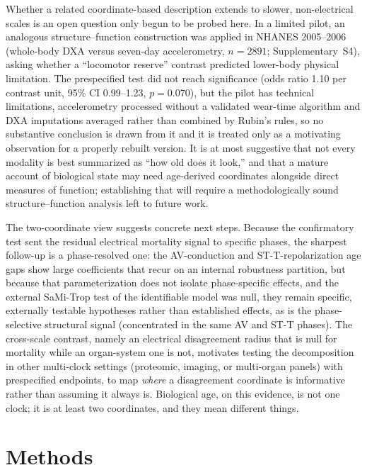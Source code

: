 \documentclass[11pt]{article}
\begin{document}
Whether a related coordinate-based description extends to slower, non-electrical scales is an open
question only begun to be probed here. In a limited pilot, an analogous
structure--function construction was applied in NHANES 2005--2006 (whole-body DXA versus seven-day
accelerometry, $n=\num{2891}$; Supplementary~S4), asking whether a ``locomotor reserve''
contrast predicted lower-body physical limitation. The prespecified test did not reach
significance (odds ratio \num{1.10} per contrast unit, 95\% CI \numrange{0.99}{1.23},
$p=\num{0.070}$), but the pilot has technical limitations, accelerometry processed
without a validated wear-time algorithm and DXA imputations averaged rather than combined
by Rubin's rules, so no substantive conclusion is drawn from it and it is treated only as
a motivating observation for a properly rebuilt version. It is at most suggestive that not
every modality is best summarized as ``how old does it look,'' and that a mature account
of biological state may need age-derived coordinates alongside direct measures of function;
establishing that will require a methodologically sound structure--function analysis
left to future work.

The two-coordinate view suggests concrete next steps. Because the confirmatory test sent
the residual electrical mortality signal to specific phases, the sharpest follow-up is a
phase-resolved one: the AV-conduction and ST-T-repolarization age gaps show large
coefficients that recur on an internal robustness partition, but because that
parameterization does not isolate phase-specific effects, and the external SaMi-Trop test
of the identifiable model was null, they remain specific, externally testable hypotheses
rather than established effects, as is the phase-selective structural signal
(concentrated in the same AV and ST-T phases). The cross-scale contrast, namely an
electrical disagreement radius that is null for mortality while an organ-system one is
not, motivates testing the decomposition in other multi-clock settings (proteomic,
imaging, or multi-organ panels) with prespecified endpoints, to map \emph{where} a
disagreement coordinate is informative rather than assuming it always is. Biological age,
on this evidence, is not one clock; it is at least two coordinates, and they mean
different things.

\section{Methods}
\end{document}
